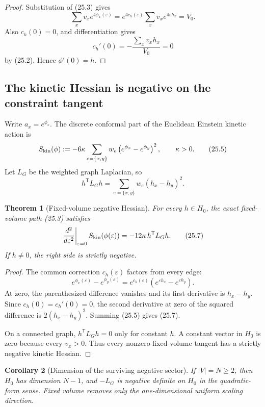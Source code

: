 \documentclass[11pt]{article}
\newtheorem{theorem}{Theorem}[section]
\newtheorem{corollary}[theorem]{Corollary}
\theoremstyle{remark}
\begin{document}
\begin{proof}
Substitution of (25.3) gives
\[
 \sum_xv_xe^{4\phi_x(\varepsilon)}
 =e^{4c_h(\varepsilon)}
  \sum_xv_xe^{4\varepsilon h_x}=V_0.
\]
Also \(c_h(0)=0\), and differentiation gives
\[
 c_h'(0)=-\frac{\sum_xv_xh_x}{V_0}=0
\]
by (25.2).  Hence \(\phi'(0)=h\).
\end{proof}

\subsection{The kinetic Hessian is negative on the constraint tangent}

Write \(a_x=e^{\phi_x}\).  The discrete conformal part of the Euclidean
Einstein kinetic action is
\[
 S_{\rm kin}(\phi)
 :=-6\kappa\sum_{e=\{x,y\}}w_e
 \left(e^{\phi_x}-e^{\phi_y}\right)^2,
 \qquad \kappa>0.                                              \tag{25.5}
\]
Let \(L_G\) be the weighted graph Laplacian, so
\[
 h^{\mathsf T}L_Gh
 =\sum_{e=\{x,y\}}w_e(h_x-h_y)^2.                              \tag{25.6}
\]

\begin{theorem}[Fixed-volume negative Hessian]
\label{thm:v19v22-negative}
For every \(h\in H_0\), the exact fixed-volume path (25.3) satisfies
\[
 \left.\frac{d^2}{d\varepsilon^2}\right|_{\varepsilon=0}
 S_{\rm kin}(\phi(\varepsilon))
 =-12\kappa\,h^{\mathsf T}L_Gh.                               \tag{25.7}
\]
If \(h\neq0\), the right side is strictly negative.
\end{theorem}

\begin{proof}
The common correction \(c_h(\varepsilon)\) factors from every edge:
\[
 e^{\phi_x(\varepsilon)}-e^{\phi_y(\varepsilon)}
 =e^{c_h(\varepsilon)}
 \left(e^{\varepsilon h_x}-e^{\varepsilon h_y}\right).         \tag{25.8}
\]
At zero, the parenthesized difference vanishes and its first derivative is
\(h_x-h_y\).  Since \(c_h(0)=c_h'(0)=0\), the second derivative at zero of
the squared difference is \(2(h_x-h_y)^2\).  Summing (25.5) gives (25.7).

On a connected graph, \(h^{\mathsf T}L_Gh=0\) only for constant \(h\).
A constant vector in \(H_0\) is zero because every \(v_x>0\).  Thus every
nonzero fixed-volume tangent has a strictly negative kinetic Hessian.
\end{proof}

\begin{corollary}[Dimension of the surviving negative sector]
\label{cor:v19v22-dimension}
If \(|V|=N\geq2\), then \(H_0\) has dimension \(N-1\), and
\(-L_G\) is negative definite on \(H_0\) in the quadratic-form sense.
Fixed volume removes only the one-dimensional uniform scaling direction.
\end{corollary}
\end{document}
